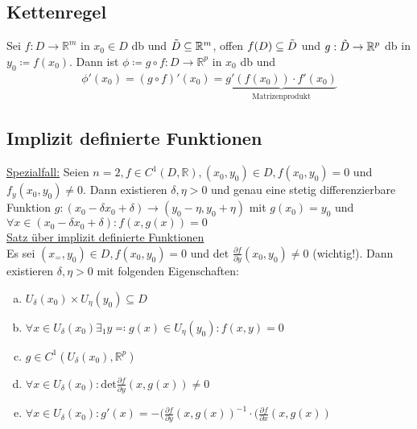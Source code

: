 \subsection{Kettenregel}
Sei $f: D \to \mathbb{R}^m$ in $x_0 \in D$ db und $\Tilde{D} \subseteq \mathbb{R}^m$, offen $f(D) \subseteq \Tilde{D}$ und $g: \Tilde{D} \to \mathbb{R}^p$ db
in $y_0 \coloneqq f(x_0)$. Dann ist  $\phi \coloneqq g\circ f: D \to \mathbb{R}^p$ in $x_0$ db und 
\begin{align*}
    \phi'(x_0) = (g \circ f)'(x_0) = \underbrace{g'(f(x_0)) \cdot f'(x_0)}_{\text{Matrizenprodukt}}
\end{align*}

\subsection{Implizit definierte Funktionen}
\underline{Spezialfall:} Seien $n=2, f\in C^1(D, \mathbb{R}),(x_0,y_0) \in D, f(x_0,y_0)=0$ und $f_y(x_0,y_0) \neq 0$. Dann existieren $\delta,\eta > 0$ und genau eine
stetig differenzierbare Funktion $g: (x_0- \delta x_0 + \delta) \to (y_0 - \eta, y_0 + \eta)$ mit $g(x_0)=y_0$
und $\forall x \in (x_0- \delta x_0 + \delta): f(x,g(x))=0$ \\
\underline{Satz über implizit definierte Funktionen} \\
Es sei $(x_=,y_0) \in D, f(x_0,y_0) = 0$ und det $\frac{\partial f}{\partial y}(x_0,y_0) \neq 0$ (wichtig!). Dann existieren $\delta,\eta > 0$ mit folgenden
Eigenschaften:
\begin{enumerate} [a)]
    \item $U_\delta (x_0) \times U_\eta (y_0) \subseteq D$
    \item $\forall x \in U_\delta(x_0) \exists_1 y \eqqcolon g(x) \in U_\eta(y_0): f(x,y)=0$
    \item $g \in C^1(U_\delta(x_0),\mathbb{R}^p)$
    \item $\forall x \in U_\delta(x_0): \text{det} \frac{\partial f}{\partial y}(x,g(x)) \neq 0$
    \item $\forall x \in U_\delta(x_0): g'(x)=-(\frac{\partial f}{\partial y}(x,g(x))^{-1} \cdot (\frac{\partial f}{\partial x}(x,g(x))$
\end{enumerate}

